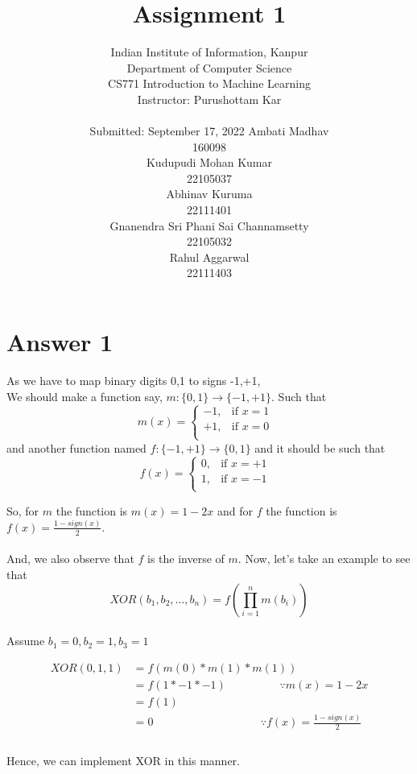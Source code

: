 \documentclass{article}
\title{Assignment 1}
\author{%
  Indian Institute of Information, Kanpur\\
  Department of Computer Science\\
  CS771 Introduction to Machine Learning\\
  Instructor: Purushottam Kar \\\\ 
  Submitted: September 17, 2022
  \AND
  Ambati Madhav  \\
 160098\\
  \And
  Kudupudi Mohan Kumar \\
  22105037 \\
   \And
  Abhinav Kuruma \\
  22111401 \\
 \AND
  Gnanendra Sri Phani Sai Channamsetty \\
  22105032 \\
  \And
  Rahul Aggarwal\\
 22111403\\
}
\begin{document}
\maketitle


\newpage
\tableofcontents
\newpage
\section{Answer 1}
As we have to map binary digits 0,1 to signs -1,+1,\\
We should make a function say, $m:\{0,1\} \to \{-1,+1\}$. Such that \\
$$
m(x)=\begin{cases}
			-1, & \text{if $x=1$ }\\
            +1, & \text{if $x=0$}\\
	   \end{cases}
$$
and another function named $f:\{-1,+1\} \to \{0,1\}$ and it should be such that \\
$$
f(x)=\begin{cases}
			0, & \text{if $x=+1$ }\\
            1, & \text{if $x=-1$}\\
		 \end{cases}
$$

So, for $m$ the function is $m(x) =1 -2x$ and for $f$ the function is $f(x) = \frac{1-sign(x)}{2}$.\\\\
And, we also observe that $f$ is the inverse of $m$. Now, let's take an example to see that
\begin{equation}
XOR(b_1,b_2, \dots ,b_n) = f\left( \prod_{i=1}^n m(b_i) \right)
\end{equation}
\\
Assume $b_1=0,b_2=1,b_3=1$

\begin{equation} \label{eq1}
\begin{split}
XOR(0,1,1) & = f( m(0) * m(1) * m(1) )\\
& = f(1*-1*-1) \hspace{2cm} \text{$\because$} m(x) = 1-2x\\
& = f(1)\\
& = 0  \hspace{4cm} \text {$\because$} f(x) = \frac{1-sign(x)}{2}\\
\end{split}
\end{equation}
\\
Hence, we can implement XOR in this manner.
\end{document}
